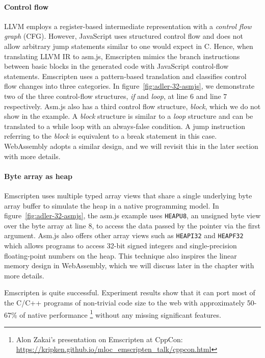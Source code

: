 \paragraph{Control flow}
LLVM employs a register-based intermediate representation with a
\emph{control flow graph} (CFG). However, JavaScript uses structured control
flow and does not allow arbitrary jump statements similar to one would expect
in C. Hence, when translating LLVM IR to asm.js, Emscripten mimics the branch
instructions between basic blocks in the generated code with JavaScript
control-flow statements. Emscripten uses a pattern-based translation and
classifies control flow changes into three categories.
In figure~\ref{fig:adler-32-asmjs}, we demonstrate two of the three
control-flow structures, \emph{if} and \emph{loop}, at line $6$ and line $7$
respectively. Asm.js also has a third control flow structure, \emph{block},
which we do not show in the example. A \emph{block} structure is similar to a
\emph{loop} structure and can be translated to a while loop with an always-false
condition. A jump instruction referring to the \emph{block} is equivalent to a
break statement in this case. WebAssembly adopts a similar design, and we will
revisit this in the later section with more details.

\paragraph{Byte array as heap}
Emscripten uses multiple typed array views that share a single underlying byte
array buffer to simulate the heap in a native programming model.
In figure~\ref{fig:adler-32-asmjs}, the asm.js example uses \texttt{HEAPU8}, an
unsigned byte view over the byte array at line $8$, to access the data passed by
the pointer via the first argument. Asm.js also offers other array views such
as \texttt{HEAPI32} and \texttt{HEAPF32} which allows programs to access 32-bit
signed integers and single-precision floating-point numbers on the heap. This
technique also inspires the linear memory design in WebAssembly, which we will
discuss later in the chapter with more details.

Emscripten is quite successful. Experiment results show that it can port most of
the C/C++ programs of non-trivial code size to the web with approximately
50-67\% of native performance
\footnote{Alon Zakai's presentation on Emscripten at CppCon:
  \\\url{https://kripken.github.io/mloc_emscripten_talk/cppcon.html}}
without any missing significant features.

